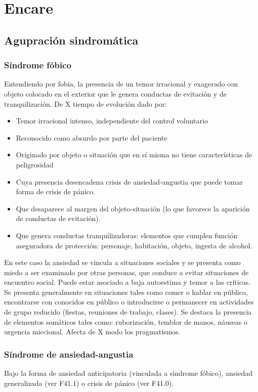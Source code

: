 \section*{Encare}
\subsection*{Agupración sindromática}
\subsubsection*{Síndrome fóbico}
Entendiendo por fobia, la presencia de un temor irracional y exagerado con objeto colocado en el exterior que le genera conductas de evitación y de tranquilización. De X tiempo de evolución dado por:
\begin{itemize}
	\item Temor irracional intenso, independiente del control voluntario
	\item Reconocido como absurdo por parte del paciente
	\item Originado por objeto o situación que en sí misma no tiene características de peligrosidad
	\item Cuya presencia desencadena crisis de ansiedad-angustia que puede tomar forma de crisis de pánico.
	\item Que desaparece al margen del objeto-situación (lo que favorece la aparición de conductas de evitación).
	\item Que genera conductas tranquilizadoras: elementos que cumplen función aseguradora de protección: personaje, habitación, objeto, ingesta de alcohol.
\end{itemize}
En este caso la ansiedad se vincula a situaciones sociales y se presenta como miedo a ser examinado por otras personas, que conduce a evitar situaciones de encuentro social. Puede estar asociado a baja autoestima y temor a las críticas. Se presenta generalmente en situaciones tales como comer o hablar en público, encontrarse con conocidos en público o introducirse o permanecer en actividades de grupo reducido (fiestas, reuniones de trabajo, clases). Se destaca la presencia de elementos somáticos tales como: ruborización, temblor de manos, náuseas o urgencia miccional. Afecta de X modo los pragmatismos.
\subsubsection*{Síndrome de ansiedad-angustia}
Bajo la forma de ansiedad anticipatoria (vinculada a síndrome fóbico), ansiedad generalizada (ver F41.1) o crisis de pánico (ver F41.0).

